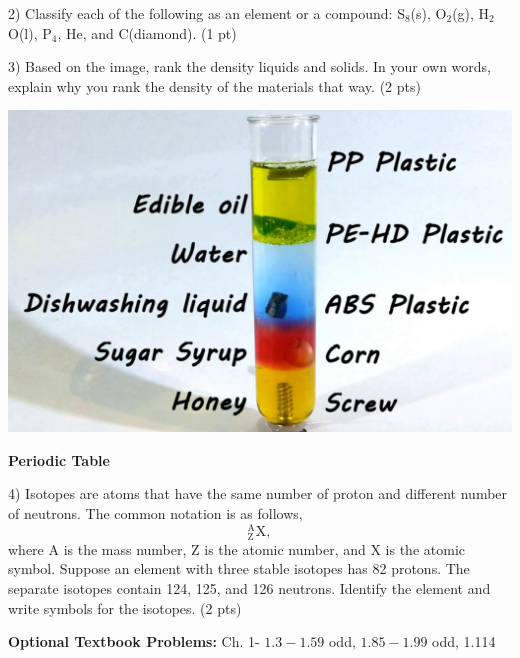 \documentclass[12pt]{article}
\begin{document}
2) Classify each of the following as an element or a compound: S$_8$(s), O$_2$(g),
H$_2$O(l), P$_4$, He, and C(diamond). (1 pt)

\vspace{0.5in}

3) Based on the image, rank the density liquids and solids. In your own words,
explain why you rank the density of the materials that way. (2 pts)

\begin{center}
  \includegraphics[scale=0.12]{dens_liq_sol}
\end{center}

\vspace{1in}

\textbf{Periodic Table}

4) Isotopes are atoms that have the same number of proton and different number of
neutrons. The common notation is as follows,
\begin{equation*}
  ^\text{A}_\text{Z}\text{X},
\end{equation*}
where A is the mass number, Z is the atomic number, and X is the atomic symbol.
Suppose an element with three stable isotopes has 82 protons. The separate isotopes contain 124,
125, and 126 neutrons. Identify the element and write symbols for the isotopes. (2 pts)

\vfill

\textbf{Optional Textbook Problems:} Ch. 1- $1.3-1.59$ odd, $1.85-1.99$ odd, 1.114
\end{document}

